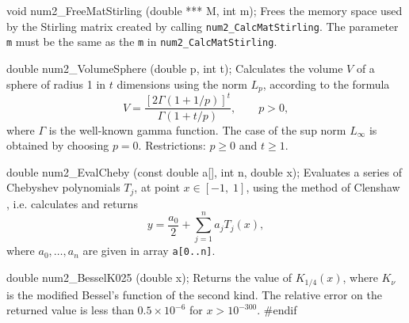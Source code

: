 void num2_FreeMatStirling (double *** M, int m);
\endcode
  \tab Frees the memory space used by the Stirling matrix created by calling
  {\tt num2\_CalcMatStirling}. The parameter {\tt m}
  must be the same as the {\tt m} in  {\tt num2\_CalcMatStirling}.
  \endtab
\code

double num2_VolumeSphere (double p, int t);
\endcode
\tab Calculates the volume $V$ of a sphere of radius 1 in $t$ dimensions
  using the norm $L_p$, according to the formula
$$
       V = \frac{\left[2 \Gamma(1 + 1/p)\right]^t}
             {\Gamma\left(1 + t/p\right)}, \qquad p > 0,
$$
  where $\Gamma$ is the well-known gamma function.
  The case of the sup norm $L_\infty$ is
  obtained by choosing $p=0$.
  Restrictions: $p\ge 0$ and $t\ge 1$.
  \endtab
\code

double num2_EvalCheby (const double a[], int n, double x);
\endcode
\tab Evaluates a series of Chebyshev polynomials $T_j$, at point
  $x \in [-1, \;1]$, using the method of Clenshaw \cite{mCLE62a},
   i.e. calculates and  returns
  $$
    y = \frac{a_0}2 + \sum_{j=1}^n a_j T_j(x),
  $$
where $a_0,\dots,a_n$	are given in array \texttt{a[0..n]}.
\endtab
\code

double num2_BesselK025 (double x);
\endcode
\tab Returns the value of $K_{1/4}(x)$, where $K_{\nu}$ is the modified
  Bessel's function of the second kind.
  The relative error on the returned value is less than
  $0.5\times 10^{-6}$ for $x > 10^{-300}$.
\endtab
\code\hide
#endif
\endhide\endcode





